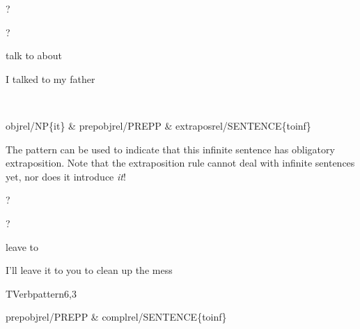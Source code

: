 
\begin{thetadescr}
\evitem ?
\esitem
     \begin{examples}
        \example  ?
     \end{examples}
\end{thetadescr}



\begin{thetadescr}
\evitem talk to about
\esitem
     \begin{examples}
        \example I talked to my father
     \end{examples}
\end{thetadescr}


\newpage
{}
\begin{vpattern}
 \norule
\csritem \mbox{}\\
     \begin{csr}
      objrel/NP\{it\} & prepobjrel/PREPP & extraposrel/SENTENCE\{toinf\}
     \end{csr}
\remarksitem The pattern can be used to indicate that this infinite sentence 
has obligatory extraposition. Note that the extraposition rule cannot deal with 
infinite sentences yet, nor does it introduce {\em it\/}!
\end{vpattern}


\begin{thetadescr}
\evitem ?
\esitem
     \begin{examples}
        \example ?
     \end{examples}
\end{thetadescr}



\begin{thetadescr}
\evitem leave to
\esitem
     \begin{examples}
        \example I'll leave it to you to clean up the mess
     \end{examples}
\end{thetadescr}


\newpage
{}
\begin{vpattern}
 TVerbpattern6,3
\csritem \mbox{}\\
     \begin{csr}
      prepobjrel/PREPP & complrel/SENTENCE\{toinf\}
     \end{csr}
\remarksitem
\end{vpattern}

